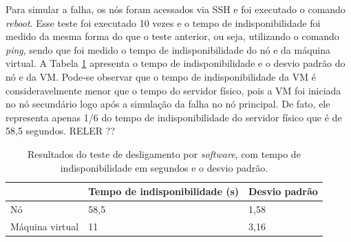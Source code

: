 Para simular a falha, os nós foram acessados via \ac{SSH} e foi executado o comando \textit{reboot}. Esse teste foi executado 10 vezes e o 
tempo de indisponibilidade foi medido da mesma forma do que o teste anterior, ou seja, utilizando o comando \textit{ping}, sendo que foi medido 
o tempo de indisponibilidade do nó e da máquina virtual. A Tabela \ref{tab:teste2resultados} apresenta o tempo de indisponibilidade e o 
desvio padrão do nó e da \ac{VM}. Pode-se observar que o tempo de indisponibilidade da \ac{VM} é consideravelmente menor que o tempo do 
servidor físico, pois a \ac{VM} foi iniciada no nó secundário logo após a simulação da falha no nó principal. 
De fato, ele representa apenas 1/6 do tempo de indisponibilidade do servidor físico que é de 58,5 segundos. 
RELER ??



\begin{table}[h!]
\caption{Resultados do teste de desligamento por \textit{software}, com tempo de indisponibilidade em segundos e o desvio padrão.}
\small
\label{tab:teste2resultados}
\begin{center}
\begin{tabular}{|l|l|l|}\hline
 & \textbf{Tempo de indisponibilidade (s)} & \textbf{Desvio padrão} \\\hline
Nó & 58,5 & 1,58 \\\hline
Máquina virtual & 11 & 3,16 \\\hline
\end{tabular}
\end{center}
\end{table}

